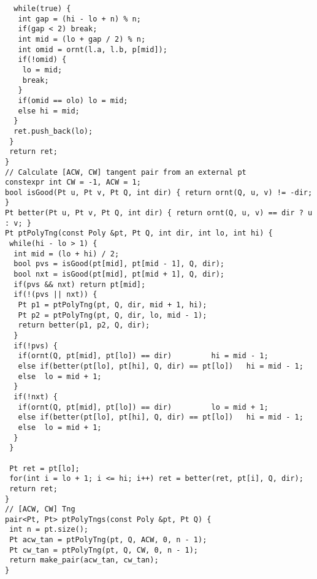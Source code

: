 \documentclass[a4paper,11pt,oneside]{article}
\begin{document}
\begin{multicols*}{\COLS}
\begin{lstlisting}
  while(true) {
   int gap = (hi - lo + n) % n;
   if(gap < 2) break;
   int mid = (lo + gap / 2) % n;
   int omid = ornt(l.a, l.b, p[mid]);
   if(!omid) {
    lo = mid;
    break;
   }
   if(omid == olo) lo = mid;
   else hi = mid;
  }
  ret.push_back(lo);
 }
 return ret;
}
// Calculate [ACW, CW] tangent pair from an external pt
constexpr int CW = -1, ACW = 1;
bool isGood(Pt u, Pt v, Pt Q, int dir) { return ornt(Q, u, v) != -dir; }
Pt better(Pt u, Pt v, Pt Q, int dir) { return ornt(Q, u, v) == dir ? u : v; }
Pt ptPolyTng(const Poly &pt, Pt Q, int dir, int lo, int hi) {
 while(hi - lo > 1) {
  int mid = (lo + hi) / 2;
  bool pvs = isGood(pt[mid], pt[mid - 1], Q, dir);
  bool nxt = isGood(pt[mid], pt[mid + 1], Q, dir);
  if(pvs && nxt) return pt[mid];
  if(!(pvs || nxt)) {
   Pt p1 = ptPolyTng(pt, Q, dir, mid + 1, hi);
   Pt p2 = ptPolyTng(pt, Q, dir, lo, mid - 1);
   return better(p1, p2, Q, dir);
  }
  if(!pvs) {
   if(ornt(Q, pt[mid], pt[lo]) == dir)         hi = mid - 1;
   else if(better(pt[lo], pt[hi], Q, dir) == pt[lo])   hi = mid - 1;
   else  lo = mid + 1;
  }
  if(!nxt) {
   if(ornt(Q, pt[mid], pt[lo]) == dir)         lo = mid + 1;
   else if(better(pt[lo], pt[hi], Q, dir) == pt[lo])   hi = mid - 1;
   else  lo = mid + 1;
  }
 }

 Pt ret = pt[lo];
 for(int i = lo + 1; i <= hi; i++) ret = better(ret, pt[i], Q, dir);
 return ret;
}
// [ACW, CW] Tng
pair<Pt, Pt> ptPolyTngs(const Poly &pt, Pt Q) {
 int n = pt.size();
 Pt acw_tan = ptPolyTng(pt, Q, ACW, 0, n - 1);
 Pt cw_tan = ptPolyTng(pt, Q, CW, 0, n - 1);
 return make_pair(acw_tan, cw_tan);
}
\end{lstlisting}

\end{multicols*}
\end{document}
